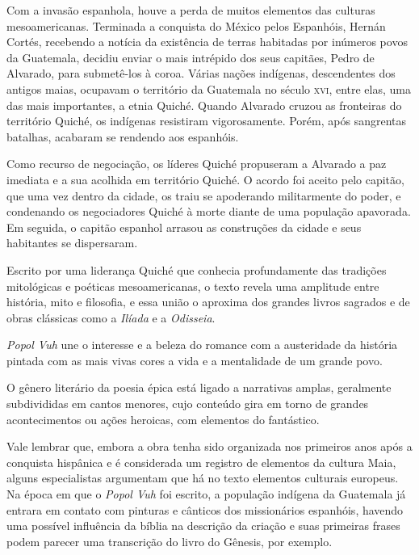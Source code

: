 \documentclass[11pt]{extarticle}
\begin{document}
Com a invasão espanhola, houve a perda de muitos elementos das culturas mesoamericanas. Terminada a conquista do México pelos Espanhóis, Hernán Cortés, recebendo a notícia da existência de terras habitadas por inúmeros povos da Guatemala, decidiu enviar o mais intrépido dos seus capitães, Pedro de Alvarado, para submetê-los à coroa.
Várias nações indígenas, descendentes dos antigos maias, ocupavam o território da Guatemala no século \textsc{xvi}, entre elas, uma das mais importantes, a etnia Quiché. Quando Alvarado cruzou as fronteiras do território Quiché, os indígenas resistiram vigorosamente. Porém, após sangrentas batalhas, acabaram se rendendo aos espanhóis.

Como recurso de negociação, os líderes Quiché propuseram a Alvarado a paz imediata e a sua acolhida em território Quiché. O acordo foi aceito pelo capitão, que uma vez dentro da cidade, os traiu se apoderando militarmente do poder, e condenando os negociadores Quiché à morte diante de uma população apavorada.
Em seguida, o capitão espanhol arrasou as construções da cidade e seus habitantes se dispersaram.





Escrito por uma liderança Quiché que conhecia profundamente das tradições mitológicas e poéticas mesoamericanas, o texto revela uma amplitude entre história, mito e filosofia, e essa união o aproxima dos grandes livros sagrados e de obras clássicas como a \emph{Ilíada} e a \emph{Odisseia}.

\textit{Popol Vuh} une o interesse e a beleza do romance com a austeridade da história pintada com as mais vivas cores a vida e a mentalidade de um grande povo.

O gênero literário da poesia épica está ligado a narrativas amplas, geralmente subdivididas em cantos menores, cujo conteúdo gira em torno de grandes acontecimentos ou ações heroicas, com elementos do fantástico.

Vale lembrar que, embora a obra tenha sido organizada nos primeiros anos após a conquista hispânica e é considerada um registro de elementos da cultura Maia, alguns especialistas argumentam que há no texto elementos culturais europeus. 
Na época em que o \textit{Popol Vuh} foi escrito, a população indígena da Guatemala já entrara em contato com pinturas e cânticos dos missionários espanhóis, havendo uma possível influência da bíblia na descrição da criação e suas primeiras frases podem parecer uma transcrição do livro do Gênesis, por exemplo. 
\end{document}
